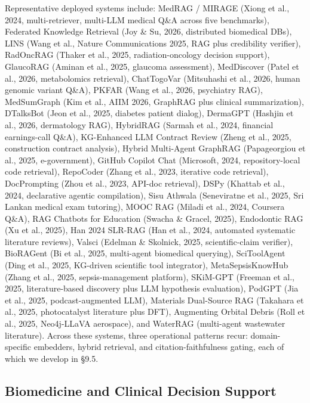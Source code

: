 Representative deployed systems include: MedRAG / MIRAGE (Xiong et al., 2024, multi-retriever, multi-LLM medical Q\&A across five benchmarks), Federated Knowledge Retrieval (Joy \& Su, 2026, distributed biomedical DBs), LINS (Wang et al., Nature Communications 2025, RAG plus credibility verifier), RadOncRAG (Thaker et al., 2025, radiation-oncology decision support), GlaucoRAG (Aminan et al., 2025, glaucoma assessment), MedDiscover (Patel et al., 2026, metabolomics retrieval), ChatTogoVar (Mitsuhashi et al., 2026, human genomic variant Q\&A), PKFAR (Wang et al., 2026, psychiatry RAG), MedSumGraph (Kim et al., AIIM 2026, GraphRAG plus clinical summarization), DTalksBot (Jeon et al., 2025, diabetes patient dialog), DermaGPT (Hashjin et al., 2026, dermatology RAG), HybridRAG (Sarmah et al., 2024, financial earnings-call Q\&A), KG-Enhanced LLM Contract Review (Zheng et al., 2025, construction contract analysis), Hybrid Multi-Agent GraphRAG (Papageorgiou et al., 2025, e-government), GitHub Copilot Chat (Microsoft, 2024, repository-local code retrieval), RepoCoder (Zhang et al., 2023, iterative code retrieval), DocPrompting (Zhou et al., 2023, API-doc retrieval), DSPy (Khattab et al., 2024, declarative agentic compilation), Sisu Athwala (Seneviratne et al., 2025, Sri Lankan medical exam tutoring), MOOC RAG (Miladi et al., 2024, Coursera Q\&A), RAG Chatbots for Education (Swacha \& Gracel, 2025), Endodontic RAG (Xu et al., 2025), Han 2024 SLR-RAG (Han et al., 2024, automated systematic literature reviews), Valsci (Edelman \& Skolnick, 2025, scientific-claim verifier), BioRAGent (Bi et al., 2025, multi-agent biomedical querying), SciToolAgent (Ding et al., 2025, KG-driven scientific tool integrator), MetaSepsisKnowHub (Zhang et al., 2025, sepsis-management platform), SKiM-GPT (Freeman et al., 2025, literature-based discovery plus LLM hypothesis evaluation), PodGPT (Jia et al., 2025, podcast-augmented LLM), Materials Dual-Source RAG (Takahara et al., 2025, photocatalyst literature plus DFT), Augmenting Orbital Debris (Roll et al., 2025, Neo4j-LLaVA aerospace), and WaterRAG (multi-agent wastewater literature). Across these systems, three operational patterns recur: domain-specific embedders, hybrid retrieval, and citation-faithfulness gating, each of which we develop in §9.5.

\subsection{Biomedicine and Clinical Decision Support}\label{biomedicine-and-clinical-decision-support}

